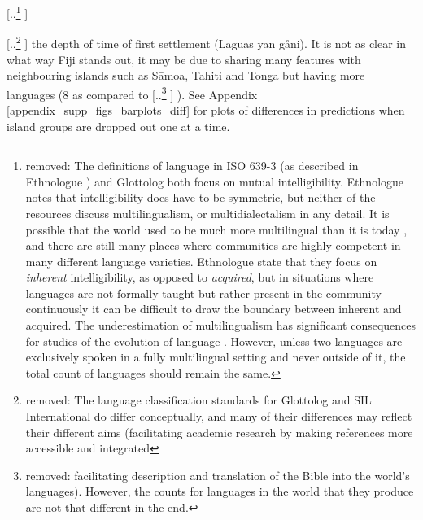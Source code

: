 \documentclass[unnumsec,webpdf,modern,medium]{oup-authoring-template}
\providecommand{\DIFaddtex}[1]{{\protect\color{blue} \sf #1}} %
\providecommand{\DIFdeltex}[1]{{\protect\color{red} [..\footnote{removed: #1} ]}} %
\providecommand{\DIFaddbegin}{} %
\providecommand{\DIFaddend}{} %
\providecommand{\DIFdelbegin}{} %
\providecommand{\DIFdelend}{} %
\providecommand{\DIFadd}[1]{\texorpdfstring{\DIFaddtex{#1}}{#1}} %
\providecommand{\DIFdel}[1]{\texorpdfstring{\DIFdeltex{#1}}{}} %
\newcommand{\DIFscaledelfig}{0.5}
\newlength{\DIFdelgraphicswidth} %
\newlength{\DIFdelgraphicsheight} %
\newcommand{\DIFaddincludegraphics}[2][]{{\color{blue}\fbox{\DIFOincludegraphics[#1]{#2}}}} %
\newcommand{\DIFdelincludegraphics}[2][]{%
\sbox{\DIFdelgraphicsbox}{\DIFOincludegraphics[#1]{#2}}%
\settoboxwidth{\DIFdelgraphicswidth}{\DIFdelgraphicsbox} %
\settoboxtotalheight{\DIFdelgraphicsheight}{\DIFdelgraphicsbox} %
\scalebox{\DIFscaledelfig}{%
\parbox[b]{\DIFdelgraphicswidth}{\usebox{\DIFdelgraphicsbox}\\[-\baselineskip] \rule{\DIFdelgraphicswidth}{0em}}\llap{\resizebox{\DIFdelgraphicswidth}{\DIFdelgraphicsheight}{%
\setlength{\unitlength}{\DIFdelgraphicswidth}%
\begin{picture}(1,1)%
\thicklines\linethickness{2pt} %
{\color[rgb]{1,0,0}\put(0,0){\framebox(1,1){}}}%
{\color[rgb]{1,0,0}\put(0,0){\line( 1,1){1}}}%
{\color[rgb]{1,0,0}\put(0,1){\line(1,-1){1}}}%
\end{picture}%
}\hspace*{3pt}}} %
} %
\DeclareRobustCommand{\DIFaddbegin}{\DIFOaddbegin \let\includegraphics\DIFaddincludegraphics} %
\DeclareRobustCommand{\DIFaddend}{\DIFOaddend \let\includegraphics\DIFOincludegraphics} %
\DeclareRobustCommand{\DIFdelbegin}{\DIFOdelbegin \let\includegraphics\DIFdelincludegraphics} %
\DeclareRobustCommand{\DIFdelend}{\DIFOaddend \let\includegraphics\DIFOincludegraphics} %
\begin{document}
\DIFdel{The definitions of language in ISO 639-3 (as described in Ethnologue \citep{ethnologue2019lgident}) and Glottolog both focus on mutual intelligibility. Ethnologue notes that intelligibility does have to be symmetric, but neither of the resources discuss multilingualism, or multidialectalism in any detail. It is possible that the world used to be much more multilingual than it is today \citep{evans2017did}, and there are still many places where communities are highly competent in many different language varieties. Ethnologue state that they focus on \emph{inherent} intelligibility, as opposed to \emph{acquired}, but in situations where languages are not formally taught but rather present in the community continuously it can be difficult to draw the boundary between inherent and acquired. The underestimation of multilingualism has significant consequences for studies of the evolution of language \citep{roberts2013evolutionary}. However, unless two languages are exclusively spoken in a fully multilingual setting and never outside of it, the total count of languages should remain the same. 
}%

\DIFdel{The language classification standards for Glottolog and SIL International do differ conceptually, and many of their differences may reflect their different aims (facilitating academic research by making references more accessible and integrated }\DIFdelend \DIFaddbegin \DIFadd{the depth of time of first settlement (Laguas yan gåni). It is not }\DIFaddend as \DIFaddbegin \DIFadd{clear in what way Fiji stands out, it may be due to sharing many features with neighbouring islands such as S\={a}moa, Tahiti and Tonga but having more languages (8 as }\DIFaddend compared to \DIFdelbegin \DIFdel{facilitating description and translation of the Bible into the world's languages). However, the counts for languages in the world that they produce are not that different in the end.
}\DIFdelend \DIFaddbegin \DIFadd{1). See Appendix \ref{appendix_supp_figs_barplots_diff} for plots of differences in predictions when island groups are dropped out one at a time.
}\DIFaddend 
\end{document}
